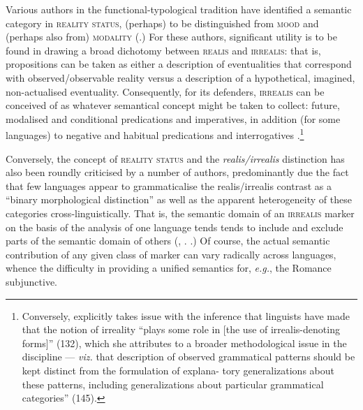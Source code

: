 Various authors in the functional-typological tradition have identified a semantic category in \textsc{reality status}, (perhaps) to be distinguished from \textsc{mood} and (perhaps also from) \textsc{modality} (\citealp[see][]{Bowern1998,Elliott2000,Roberts1990a,Michael2014,McGregor2006,Mithun1995,Chafe1995}.) For these authors, significant utility is to be found in drawing a broad dichotomy between \textsc{realis} and \textsc{irrealis}: that is, propositions can be taken as either a description of eventualities that correspond with observed/observable reality versus a description of a hypothetical, imagined, non-actualised eventuality. Consequently, for its defenders, \textsc{irrealis} can be conceived of as whatever semantical concept might be taken to collect: future, modalised and conditional predications and imperatives, in addition (for some languages) to negative and habitual predications and interrogatives \citep[see also][]{Palmer2001,Givon1994,Plungian2005}.\footnote{Conversely, \citet{Cristofaro2012} explicitly takes issue with the inference that linguists have made that the notion of irreality ``plays some role in [the use of irrealis-denoting forms]'' (132), which she attributes to a broader methodological issue in the discipline --- \textit{viz.} that description of observed grammatical patterns should be kept distinct from the formulation of explana- tory generalizations about these patterns, including generalizations about particular grammatical categories'' (145).} 

Conversely, the concept of \textsc{reality status} and the \textit{realis/irrealis} distinction has also been roundly criticised by a number of authors, predominantly due the fact that few languages appear to grammaticalise the realis/irrealis contrast as a ``binary morphological distinction'' as well as the apparent heterogeneity of these categories cross-linguistically. That is, the semantic domain of an \textsc{irrealis} marker on the basis of the analysis of one language tends tends to include and exclude parts of the semantic domain of others (\citealp[see][238]{Bybee1994}, \citealp[\textit{apud}][158\textit{ff}]{Foley1986}. \citealp[See also, \textit{e.g.},][]{Bybee1998,Portner2018a,Haan2012}.) Of course, the actual semantic contribution of any given class of marker can vary radically across languages, whence the difficulty in providing a unified semantics for, \textit{e.g.}, the Romance subjunctive.

